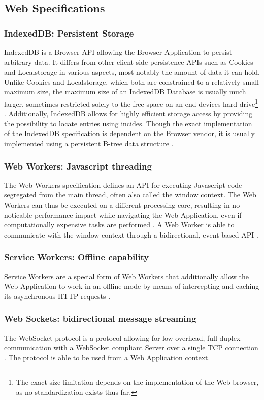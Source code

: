 \subsection{Web Specifications}
\subsubsection{IndexedDB: Persistent Storage}
IndexedDB is a Browser API allowing the Browser Application to persist arbitrary data. It differs from other client side persistence APIs such as Cookies and Localstorage in various aspects, most notably the amount of data it can hold. Unlike Cookies and Localstorage, which both are constrained to a relatively small maximum size, the maximum size of an IndexedDB Database is usually much larger, sometimes restricted solely to the free space on an end devices hard drive\footnote{The exact size limitation depends on the implementation of the Web browser, as no standardization exists thus far.} \cite{MDNIndexedDB}. Additionally, IndexedDB allows for highly efficient storage access by providing the possibility to locate entries using incides. Though the exact implementation of the IndexedDB specification is dependent on the Browser vendor, it is usually implemented using a persistent B-tree data structure \cite[sec. 1]{IndexedDBSpec}.
\subsubsection{Web Workers: Javascript threading}
\label{sec:tech-web-worker}
The Web Workers specification defines an API for executing Javascript code segregated from the main thread, often also called the window context. The Web Workers can thus be executed on a different processing core, resulting in no noticable performance impact while navigating the Web Application, even if computationally expensive tasks are performed \cite[sec. 1.2.1]{workerdraft}. A Web Worker is able to communicate with the window context through a bidirectional, event based API \cite[sec. 4.6.1]{workerdraft}.
\subsubsection{Service Workers: Offline capability}
Service Workers are a special form of Web Workers that additionally allow the Web Application to work in an offline mode by means of intercepting and caching its asynchronous HTTP requests \cite[sec 4.5, 5]{serviceworkersdraft}.
\subsubsection{Web Sockets: bidirectional message streaming}
The WebSocket protocol is a protocol allowing for low overhead, full-duplex communication with a WebSocket compliant Server over a single TCP connection \cite[sec. 1.1]{rfc6455}. The protocol is able to be used from a Web Application context.
\label{sec:tech-web-sockets}
